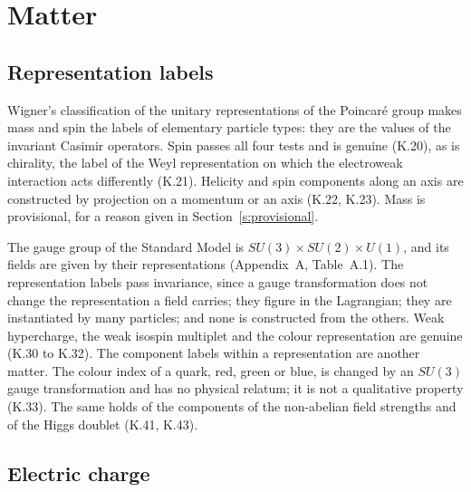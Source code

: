 \documentclass{situationist-preprint}
\begin{document}
\section{Matter}\label{s:matter}

\subsection{Representation labels}

Wigner's classification of the unitary representations of the Poincar\'e group \citep{Wigner1939} makes mass and spin the labels of elementary particle types: they are the values of the invariant Casimir operators. Spin passes all four tests and is genuine (K.20), as is chirality, the label of the Weyl representation on which the electroweak interaction acts differently (K.21). Helicity and spin components along an axis are constructed by projection on a momentum or an axis (K.22, K.23). Mass is provisional, for a reason given in Section~\ref{s:provisional}.

The gauge group of the Standard Model is $SU(3)\times SU(2)\times U(1)$, and its fields are given by their representations (Appendix~A, Table~A.1). The representation labels pass invariance, since a gauge transformation does not change the representation a field carries; they figure in the Lagrangian; they are instantiated by many particles; and none is constructed from the others. Weak hypercharge, the weak isospin multiplet and the colour representation are genuine (K.30 to K.32). The component labels within a representation are another matter. The colour index of a quark, red, green or blue, is changed by an $SU(3)$ gauge transformation and has no physical relatum; it is not a qualitative property (K.33). The same holds of the components of the non-abelian field strengths and of the Higgs doublet (K.41, K.43).

\subsection{Electric charge}
\end{document}
